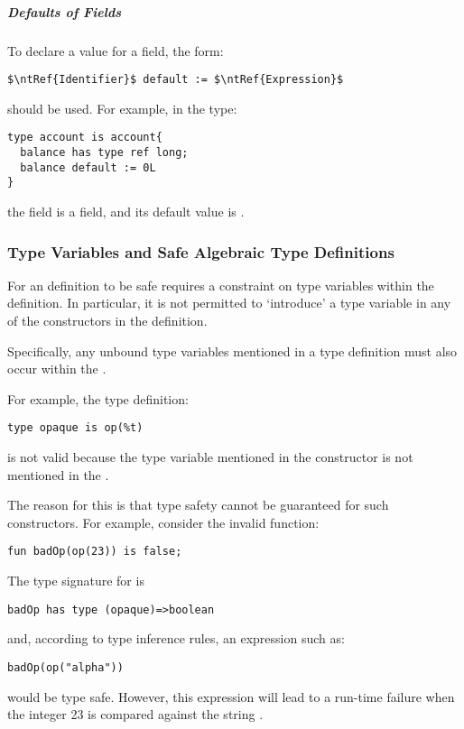 \subparagraph{Defaults of  Fields}
To declare a  value for a  field, the form:
\begin{lstlisting}[mathescape=true]
$\ntRef{Identifier}$ default := $\ntRef{Expression}$
\end{lstlisting}
should be used. For example, in the type:
\begin{lstlisting}
type account is account{
  balance has type ref long;
  balance default := 0L
}
\end{lstlisting}
the  field is a  field, and its default value is .

\subsubsection{Type Variables and Safe Algebraic Type Definitions}
For an  definition to be safe requires a constraint on type variables within the definition. In particular, it is not permitted to `introduce' a type variable in any of the constructors in the definition. 

\begin{aside}
Specifically, any unbound type variables mentioned in a type definition must also occur within the .
\end{aside}

For example, the type definition:
\begin{lstlisting}
type opaque is op(%t)
\end{lstlisting}
is not valid because the type variable  mentioned in the  constructor is not mentioned in the .

\begin{aside}
The reason for this is that type safety cannot be guaranteed for such constructors. For example, consider the invalid function:
\begin{lstlisting}
fun badOp(op(23)) is false;
\end{lstlisting}
The type signature for  is 
\begin{lstlisting}
badOp has type (opaque)=>boolean
\end{lstlisting}
and, according to type inference rules, an expression such as:
\begin{lstlisting}
badOp(op("alpha"))
\end{lstlisting}
would be type safe. However, this expression will lead to a run-time failure when the integer 23 is compared against the string .
\end{aside}


